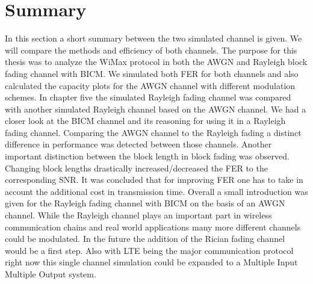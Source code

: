 \chapter{Summary} \label{chap:ending}
\graphicspath{{C:/Users/Kevin/Bachelarbeit/Bachelorarbeit/01_Bachelorarbeit_LaTex/02_Figures/}}
In this section a short summary between the two simulated channel is given. We will compare the methods and efficiency of both channels.
The purpose for this thesis was to analyze the WiMax protocol in both the AWGN and Rayleigh block fading channel with BICM. We simulated both \gls{FER} for both channels and also calculated the capacity plots for the AWGN channel with different modulation schemes. In chapter five the simulated Rayleigh fading channel was compared with another simulated Rayleigh channel based on the AWGN channel.
\newline
We had a closer look at the BICM channel and its reasoning for using it in a Rayleigh fading channel. Comparing the AWGN channel to the Rayleigh fading a distinct difference in performance was detected between those channels. 
Another important distinction between the block length in block fading was observed. Changing block lengths drastically increased/decreased the \gls{FER} to the corresponding \gls{SNR}. It was concluded that for improving \gls{FER} one has to take in account the additional cost in transmission time.
\newline
Overall a small introduction was given for the Rayleigh fading channel with BICM on the basis of an AWGN channel. While the Rayleigh channel plays an important part in wireless communication chains and real world applications many more different channels could be modulated. In the future the addition of the Rician fading channel would be a first step. Also with LTE being the major communication protocol right now this single channel simulation could be expanded to a Multiple Input Multiple Output system.
\newline


\clearpage
